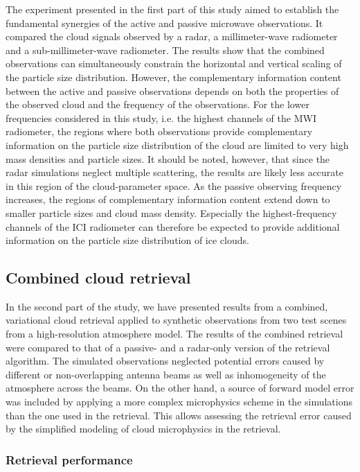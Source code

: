 \documentclass[journal abbreviation, manuscript]{copernicus}
\begin{document}
The experiment presented in the first part of this study aimed to establish the
fundamental synergies of the active and passive microwave observations. It
compared the cloud signals observed by a radar, a millimeter-wave radiometer and
a sub-millimeter-wave radiometer. The results show that the combined
observations can simultaneously constrain the horizontal and vertical scaling of
the particle size distribution. However, the complementary information content
between the active and passive observations depends on both the properties of
the observed cloud and the frequency of the observations. For the lower
frequencies considered in this study, i.e. the highest channels of the MWI
radiometer, the regions where both observations provide complementary
information on the particle size distribution of the cloud are limited to very
high mass densities and particle sizes. It should be noted, however, that since
the radar simulations neglect multiple scattering, the results are likely less
accurate in this region of the cloud-parameter space. As the passive observing
frequency increases, the regions of complementary information content extend
down to smaller particle sizes and cloud mass density. Especially the
highest-frequency channels of the ICI radiometer can therefore be expected to
provide additional information on the particle size distribution of ice clouds.

\subsection{Combined cloud retrieval}

In the second part of the study, we have presented results from a combined,
variational cloud retrieval applied to synthetic observations from two test
scenes from a high-resolution atmosphere model. The results of the combined
retrieval were compared to that of a passive- and a radar-only version of the
retrieval algorithm. The simulated observations neglected potential errors
caused by different or non-overlapping antenna beams as well as inhomogeneity of
the atmosphere across the beams. On the other hand, a source of forward model
error was included by applying a more complex microphysics scheme in the
simulations than the one used in the retrieval. This allows assessing the
retrieval error caused by the simplified modeling of cloud microphysics in the
retrieval.

\subsubsection{Retrieval performance}
\end{document}
